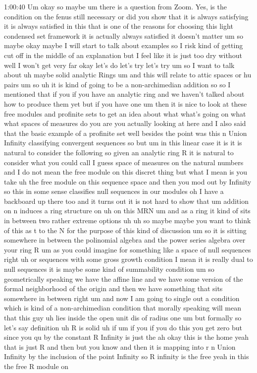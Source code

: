 \begin{unfinished}{1:00:40}
Um okay so maybe um there is a question from Zoom. Yes, is the condition on the fenus still necessary or did you show that it is always satisfying it is always satisfied in this that is  one of the reasons for choosing this light condensed set framework it is actually always satisfied it doesn't matter um so maybe okay maybe I will start to talk about examples so I risk kind of getting cut off in the middle of an explanation but I feel like it is just too dry without well I won't get very far okay let's do let's try let's try um so I want to talk about uh maybe solid analytic Rings um and this will relate to attic spaces or hu pairs um so uh it is kind of going to be a non-archimedian addition so so I mentioned that if you if you have an analytic ring and we haven't talked about how to produce them yet but if you have one um then it is nice to look at these free modules and profinite sets to get an idea about what what's going on what what spaces of measures do you are you actually looking at here and I also said that the basic example of a profinite set well besides the point was this n Union Infinity classifying convergent sequences so but um in this linear case it is it is natural to consider the following so given an analytic ring R it is natural to consider what you could call I guess space of measures on the natural numbers and I do not mean the free module on this discret thing but what I mean is you take uh the free module on this sequence space and then you mod out by Infinity so this in some sense classifies null sequences in our modules oh I have a backboard up there too and it turns out it is not hard to show that um addition on n induces a ring structure on uh on this MRN um and as a ring it kind of sits in between two rather extreme options uh uh so maybe maybe you want to think of this as t to the N for the purpose of this kind of discussion um so it is sitting somewhere in between the polinomial algebra and the power series algebra over your ring R um as you could imagine for something like a space of null sequences right uh or sequences with some gross growth condition I mean it is really dual to null sequences it is maybe some kind of summability condition um so geometrically speaking we have the affine line and we have some version of the formal neighborhood of the origin and then we have something that sits somewhere in between right um and now I am going to single out a condition which is kind of a non-archimedian condition that morally speaking will mean that this guy uh lies inside the open unit dis of radius one um but formally so let's say definition uh R is solid uh if um if you if you do this you get zero but since you qu by the constant R Infinity is just the ah okay this is the home yeah that is  just R and then but you know and then it is mapping into r n Union Infinity by the inclusion of the point Infinity so R infinity is the free yeah in this the free R module on


\end{unfinished}
